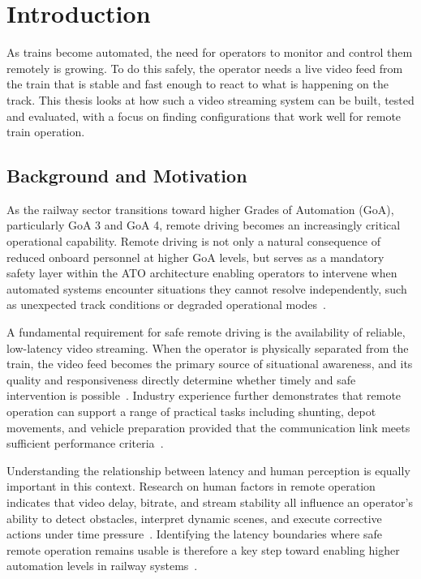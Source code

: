 \section{Introduction}
As trains become automated, the need for operators to monitor and control them remotely is growing. To do this safely, the operator needs a live video feed from the train that is stable and fast enough to react to what is happening on the track. This thesis looks at how such a video streaming system can be built, tested and evaluated, with a focus on finding configurations that work well for remote train operation.

\subsection{Background and Motivation}
As the railway sector transitions toward higher Grades of Automation (GoA), particularly GoA 3 and GoA 4, remote driving becomes an increasingly critical operational capability. Remote driving is not only a natural consequence of reduced onboard personnel at higher GoA levels, but serves as a mandatory safety layer within the ATO architecture enabling operators to intervene when automated systems encounter situations they cannot resolve independently, such as unexpected track conditions or degraded operational modes~\cite{orr2024, europesrail2025_d3}.

A fundamental requirement for safe remote driving is the availability of reliable, low-latency video streaming. When the operator is physically separated from the train, the video feed becomes the primary source of situational awareness, and its quality and responsiveness directly determine whether timely and safe intervention is possible~\cite{mejias2024, myhrvold2025}. Industry experience further demonstrates that remote operation can support a range of practical tasks including shunting, depot movements, and vehicle preparation provided that the communication link meets sufficient performance criteria~\cite{fp2r2dato2023d5_4}.

Understanding the relationship between latency and human perception is equally important in this context. Research on human factors in remote operation indicates that video delay, bitrate, and stream stability all influence an operator's ability to detect obstacles, interpret dynamic scenes, and execute corrective actions under time pressure~\cite{brandenburger2023, neumeier2019}. Identifying the latency boundaries where safe remote operation remains usable is therefore a key step toward enabling higher automation levels in railway systems~\cite{myhrvold2025}.


